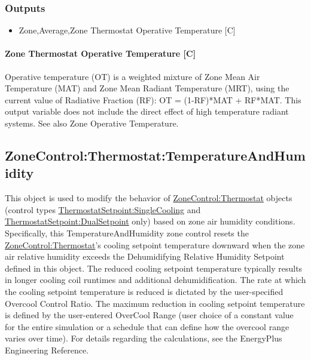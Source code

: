 \subsubsection{Outputs}\label{outputs-1-032}

\begin{itemize}
\tightlist
\item
  Zone,Average,Zone Thermostat Operative Temperature {[}C{]}
\end{itemize}

\paragraph{Zone Thermostat Operative Temperature {[}C{]}}\label{zone-thermostat-operative-temperature-c}

Operative temperature (OT) is a weighted mixture of Zone Mean Air Temperature (MAT) and Zone Mean Radiant Temperature (MRT), using the current value of Radiative Fraction (RF): OT = (1-RF)*MAT + RF*MAT. This output variable does not include the direct effect of high temperature radiant systems. See also Zone Operative Temperature.

\subsection{ZoneControl:Thermostat:TemperatureAndHumidity}\label{zonecontrolthermostattemperatureandhumidity}

This object is used to modify the behavior of \hyperref[zonecontrolthermostat]{ZoneControl:Thermostat} objects (control types \hyperref[thermostatsetpointsinglecooling]{ThermostatSetpoint:SingleCooling} and \hyperref[thermostatsetpointdualsetpoint]{ThermostatSetpoint:DualSetpoint} only) based on zone air humidity conditions. Specifically, this TemperatureAndHumidity zone control resets the \hyperref[zonecontrolthermostat]{ZoneControl:Thermostat}'s cooling setpoint temperature downward when the zone air relative humidity exceeds the Dehumidifying Relative Humidity Setpoint defined in this object. The reduced cooling setpoint temperature typically results in longer cooling coil runtimes and additional dehumidification. The rate at which the cooling setpoint temperature is reduced is dictated by the user-specified Overcool Control Ratio. The maximum reduction in cooling setpoint temperature is defined by the user-entered OverCool Range (user choice of a constant value for the entire simulation or a schedule that can define how the overcool range varies over time). For details regarding the calculations, see the EnergyPlus Engineering Reference.

